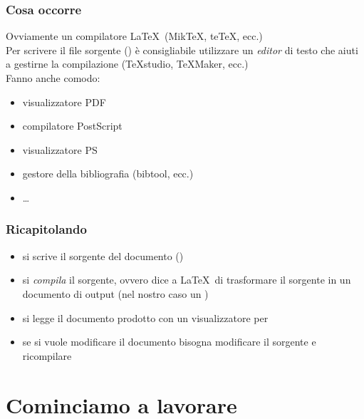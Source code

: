 \documentclass[10pt,svgnames,%
ucs,%
pdftex]{mybeamer}
\begin{document}
\begin{frame}
	\frametitle{Cosa occorre}
	Ovviamente un compilatore \LaTeX\ (\alert{Mik\TeX}, \alert{te\TeX}, ecc.)\\
	\medskip
	\onslide<2->
	Per scrivere il file sorgente () \`e consigliabile
	utilizzare un \emph{editor}\/ di testo che aiuti a gestirne la
	compilazione (\alert{\TeX studio}, \alert{\TeX Maker}, ecc.)\\
	\medskip
	\onslide<3->
	Fanno anche comodo:
	\begin{itemize}
		\item visualizzatore PDF
		\item compilatore PostScript
		\item visualizzatore PS
		\item gestore della bibliografia (\alert{bibtool}, ecc.)
		\item \dots
	\end{itemize}
\end{frame}

\begin{frame}
	\frametitle{Ricapitolando} 
	\begin{itemize}[<+->]
		\item si scrive il sorgente del documento ()
		\item si \emph{compila} il sorgente, ovvero dice a \LaTeX\ di trasformare il sorgente in un documento di output (nel nostro caso un )
		\item si legge il documento prodotto con un visualizzatore per 
		\item se si vuole modificare il documento bisogna modificare il	sorgente e ricompilare
	\end{itemize}
\end{frame}
\section{Cominciamo a lavorare}
\end{document}
